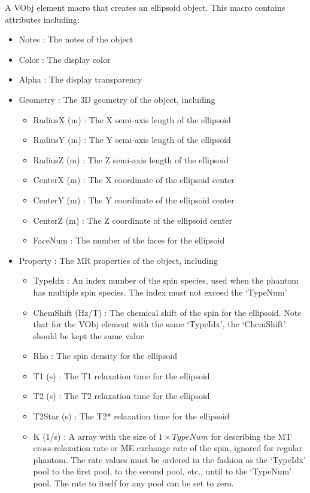 \documentclass{book}%
\begin{document}
A VObj element macro that creates an ellipsoid object. This macro contains attributes including:

\begin{itemize}
	\item Notes : The notes of the object
	\item Color : The display color
	\item Alpha : The display transparency
	\item Geometry : The 3D geometry of the object, including
	\begin{itemize}
		\item RadiusX (m) : The X semi-axis length of the ellipsoid
		\item RadiusY (m) : The Y semi-axis length of the ellipsoid
		\item RadiusZ (m) : The Z semi-axis length of the ellipsoid
		\item CenterX (m) : The X coordinate of the ellipsoid center
		\item CenterY (m) : The Y coordinate of the ellipsoid center
		\item CenterZ (m) : The Z coordinate of the ellipsoid center
		\item FaceNum : The number of the faces for the ellipsoid
	\end{itemize}
	\item Property : The MR properties of the object, including
	\begin{itemize}
		\item TypeIdx : An index number of the spin species, used when the phantom has multiple spin species. The index must not exceed the `TypeNum'
		\item ChemShift (Hz/T) : The chemical shift of the spin for the ellipsoid. Note that for the VObj element with the same `TypeIdx', the `ChemShift' should be kept the same value
		\item Rho : The spin density for the ellipsoid
		\item T1 (s) : The T1 relaxation time for the ellipsoid
		\item T2 (s) : The T2 relaxation time for the ellipsoid
		\item T2Star (s) : The T2* relaxation time for the ellipsoid
		\item K (1/s) : A array with the size of $1 \times TypeNum$ for describing the MT cross-relaxation rate or ME exchange rate of the spin, ignored for regular phantom. The rate values must be ordered in the fashion as the `TypeIdx' pool to the first pool, to the second pool, etc., until to the `TypeNum' pool. The rate to itself for any pool can be set to zero.
	\end{itemize}
\end{itemize}
\end{document}
